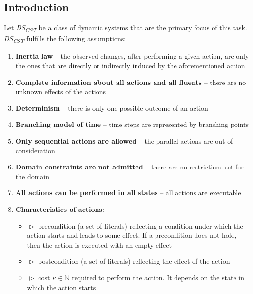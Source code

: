 \documentclass[a4paper]{article}
\begin{document}
\subsection{Introduction}
Let \emph{DS\textsubscript{CST}} be a class of dynamic systems that are the primary focus of this task. \emph{DS\textsubscript{CST}} fulfills the following assumptions: 
\begin{enumerate}[label=A{{\arabic*}}., leftmargin=*]
    \item  \textbf{Inertia law} -- the observed changes, after performing a given action, are only the ones that are directly or indirectly induced by the aforementioned action 
    \item \textbf{Complete information about all actions and all fluents} -- there are no unknown effects of the actions 
    \item \textbf{Determinism} -- there is only one possible outcome of an action 
    \item \textbf{Branching model of time} -- time steps are represented by branching points 
    \item \textbf{Only sequential actions are allowed} -- the parallel actions are out of consideration 
    \item \textbf{Domain constraints are not admitted} -- there are no restrictions set for the domain 
    \item \textbf{All actions can be performed in all states} --  all actions are executable
    \item \textbf{Characteristics of actions}:
        \begin{itemize}
            \item[] $\vartriangleright$ precondition (a set of literals) reflecting a condition under which the action starts and leads to some effect. If a precondition does not hold, then the action is executed with an empty effect
            \item[] $\vartriangleright$ postcondition (a set of literals) reflecting the effect of the action
            \item[] $\vartriangleright$ cost $\kappa \in \mathbb{N}$ required to perform the action. It depends on the state in which the action starts
        \end{itemize}
\end{enumerate}
\end{document}
